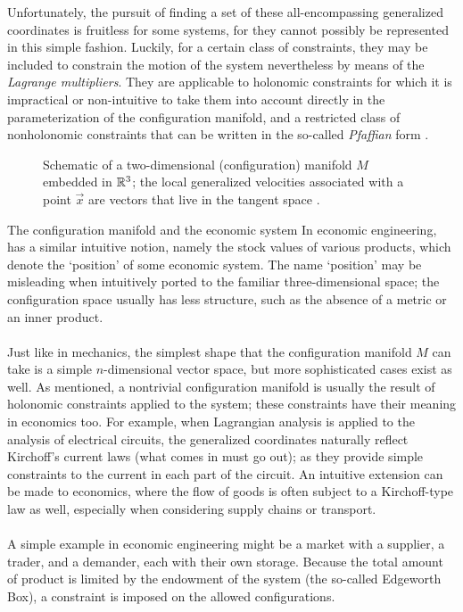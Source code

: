 Unfortunately, the pursuit of finding a set of these all-encompassing generalized coordinates is fruitless for some systems, for they cannot possibly be represented in this simple fashion. Luckily, for a certain class of constraints, they may be included to constrain the motion of the system nevertheless by means of the \emph{Lagrange multipliers}. They are applicable to holonomic constraints for which it is impractical or non-intuitive to take them into account directly in the parameterization of the configuration manifold, and a restricted class of nonholonomic constraints that can be written in the so-called \emph{Pfaffian} form \cite{Bullo2005}.

\begin{figure}[ht]
    \centering
    
    \caption{Schematic of a two-dimensional (configuration) manifold $M$ embedded in $\mathbb{R}^3$; the local generalized velocities associated with a point $\vec{x}$ are vectors that live in the tangent space .}
    \label{fig:conf_mnfold}
\end{figure}

\begin{econ}{The configuration manifold and the economic system}
    In economic engineering,  has a similar intuitive notion, namely the stock values of various products, which denote the `position' of some economic system. The name `position' may be misleading when intuitively ported to the familiar three-dimensional space; the configuration space usually has less structure, such as the absence of a metric or an inner product.\\~\\
    Just like in mechanics, the simplest shape that the configuration manifold $M$ can take is a simple $n$-dimensional vector space, but more sophisticated cases exist as well. As mentioned, a nontrivial configuration manifold is usually the result of holonomic constraints applied to the system; these constraints have their meaning in economics too.
    For example, when Lagrangian analysis is applied to the analysis of electrical circuits, the generalized coordinates naturally reflect Kirchoff's current laws (what comes in must go out); as they provide simple constraints to the current in each part of the circuit. An intuitive extension can be made to economics, where the flow of goods is often subject to a Kirchoff-type law as well, especially when considering supply chains or transport. \\~\\
    A simple example in economic engineering might be a market with a supplier, a trader, and a demander, each with their own storage. Because the total amount of product is limited by the endowment of the system (the so-called Edgeworth Box), a constraint is imposed on the allowed configurations.
\end{econ}


